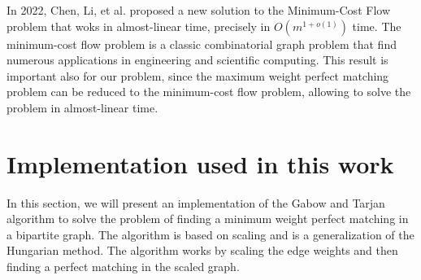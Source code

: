 In 2022, Chen, Li, et al. \cite{chen2022maximum} proposed a new solution to the Minimum-Cost Flow problem that woks in almost-linear time, precisely in $O(m^{1+o(1)})$ time. The minimum-cost flow problem is a classic combinatorial graph
problem that find numerous applications in engineering and
scientific computing. This result is important also for our problem, since the maximum weight perfect matching problem can be reduced to the minimum-cost flow problem, allowing to solve the problem in almost-linear time.

\section{Implementation used in this work}
In this section, we will present an implementation of the Gabow and Tarjan algorithm to solve the problem of finding a minimum weight perfect matching in a bipartite graph. The algorithm is based on scaling and is a generalization of the Hungarian method. The algorithm works by scaling the edge weights and then finding a perfect matching in the scaled graph. 
